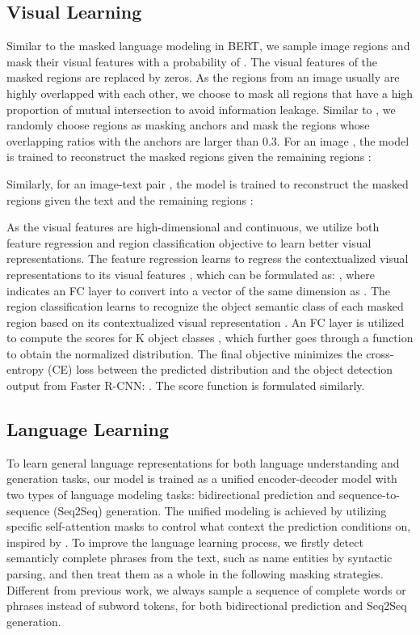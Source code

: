 \documentclass[11pt,a4paper]{article}
\begin{document}
\subsection{Visual Learning}
\label{ssec:vis}

Similar to the masked language modeling in BERT, we sample image regions and mask their visual features with a probability of .
The visual features of the masked regions are replaced by zeros.
As the regions from an image usually are highly overlapped with each other, we choose to mask all regions that have a high proportion of mutual intersection to avoid information leakage.
Similar to \citet{lin2020interbert}, we randomly choose regions as masking anchors and mask the regions whose overlapping ratios with the anchors are larger than 0.3.
For an image , the model is trained to reconstruct the masked regions  given the remaining regions :

Similarly, for an image-text pair , the model is trained to reconstruct the masked regions  given the text  and the remaining regions :


As the visual features are high-dimensional and continuous, we utilize both feature regression and region classification objective to learn better visual representations.
The feature regression learns to regress the contextualized visual representations  to its visual features , which can be formulated as: , where  indicates an FC layer to convert  into a vector of the same dimension as .
The region classification learns to recognize the object semantic class of each masked region based on its contextualized visual representation .
An FC layer is utilized to compute the scores for K object classes , which further goes through a  function to obtain the normalized distribution.
The final objective minimizes the cross-entropy (CE) loss between the predicted distribution and the object detection output  from Faster R-CNN: .
The score function  is formulated similarly.


\subsection{Language Learning}
\label{ssec:lan}

To learn general language representations for both language understanding and generation tasks, our model is trained as a unified encoder-decoder model with two types of language modeling tasks: bidirectional prediction and sequence-to-sequence (Seq2Seq) generation.
The unified modeling is achieved by utilizing specific self-attention masks to control what context the prediction conditions on, inspired by \citet{dong2019unified}.
To improve the language learning process, we firstly detect semanticly complete phrases from the text, such as name entities by syntactic parsing, and then treat them as a whole in the following masking strategies.
Different from previous work, we always sample a sequence of complete words or phrases instead of subword tokens, for both bidirectional prediction and Seq2Seq generation.
\end{document}
